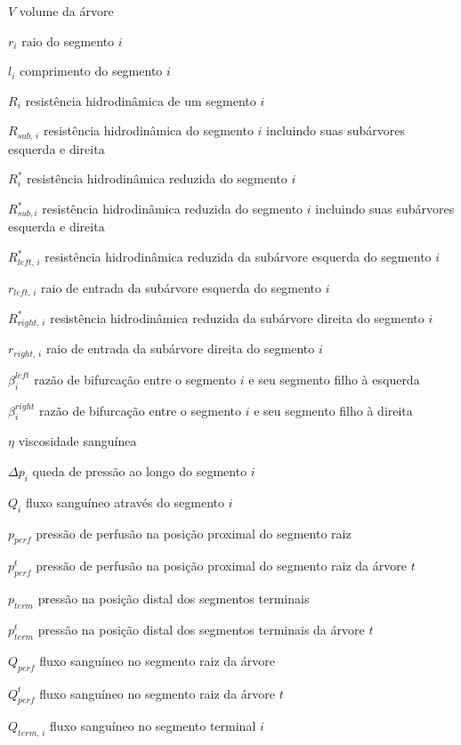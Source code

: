 \begin{simbolos}
  \item[$V$] volume da árvore
  \item[$r_i$] raio do segmento $i$
  \item[$l_i$] comprimento do segmento $i$
  \item[$R_i$] resistência hidrodinâmica de um segmento $i$
  \item[$R_{sub,\,i}$] resistência hidrodinâmica do segmento $i$ incluindo suas subárvores 
esquerda e direita
  \item[$R^*_{i}$] resistência hidrodinâmica reduzida do segmento $i$
  \item[$R^*_{sub,i}$] resistência hidrodinâmica reduzida do segmento $i$ incluindo suas subárvores 
esquerda e direita
  \item[$R^*_{left,\,i}$] resistência hidrodinâmica reduzida da subárvore esquerda do segmento $i$
  \item[$r_{left,\,i}$] raio de entrada da subárvore esquerda do segmento $i$
  \item[$R^*_{right,\,i}$] resistência hidrodinâmica reduzida da subárvore direita do segmento $i$
  \item[$r_{right,\,i}$] raio de entrada da subárvore direita do segmento $i$
  \item[$\beta_{i}^{left}$] razão de bifurcação entre o segmento $i$ e seu segmento filho à esquerda
  \item[$\beta_{i}^{right}$] razão de bifurcação entre o segmento $i$ e seu segmento filho à direita
  \item[$\eta$] viscosidade sanguínea
  \item[$\Delta p_i$] queda de pressão ao longo do segmento $i$
  \item[$Q_i$] fluxo sanguíneo através do segmento $i$
  \item[$p_{perf}$] pressão de perfusão na posição proximal do segmento raiz
  \item[$p_{perf}^t$] pressão de perfusão na posição proximal do segmento raiz da árvore $t$
  \item[$p_{term}$] pressão na posição distal dos segmentos terminais
  \item[$p_{term}^t$] pressão na posição distal dos segmentos terminais da árvore $t$
  \item[$Q_{perf}$] fluxo sanguíneo no segmento raiz da árvore
  \item[$Q_{perf}^t$] fluxo sanguíneo no segmento raiz da árvore $t$
  \item[$Q_{term,\,i}$] fluxo sanguíneo no segmento terminal $i$

\end{simbolos}
